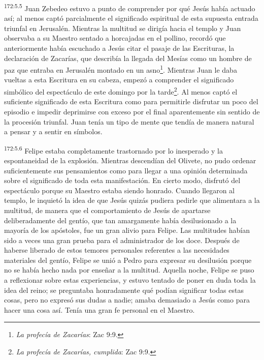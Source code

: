 \par
\textsuperscript{172:5.5} Juan Zebedeo estuvo a punto de comprender por qué Jesús había actuado así; al menos captó parcialmente el significado espiritual de esta supuesta entrada triunfal en Jerusalén. Mientras la multitud se dirigía hacia el templo y Juan observaba a su Maestro sentado a horcajadas en el pollino, recordó que anteriormente había escuchado a Jesús citar el pasaje de las Escrituras, la declaración de Zacarías, que describía la llegada del Mesías como un hombre de paz que entraba en Jerusalén montado en un asno\footnote{\textit{La profecía de Zacarías}: Zac 9:9.}. Mientras Juan le daba vueltas a esta Escritura en su cabeza, empezó a comprender el significado simbólico del espectáculo de este domingo por la tarde\footnote{\textit{La profecía de Zacarías, cumplida}: Zac 9:9.}. Al menos captó el suficiente significado de esta Escritura como para permitirle disfrutar un poco del episodio e impedir deprimirse con exceso por el final aparentemente sin sentido de la procesión triunfal. Juan tenía un tipo de mente que tendía de manera natural a pensar y a sentir en símbolos.

\par
\textsuperscript{172:5.6} Felipe estaba completamente trastornado por lo inesperado y la espontaneidad de la explosión. Mientras descendían del Olivete, no pudo ordenar suficientemente sus pensamientos como para llegar a una opinión determinada sobre el significado de toda esta manifestación. En cierto modo, disfrutó del espectáculo porque su Maestro estaba siendo honrado. Cuando llegaron al templo, le inquietó la idea de que Jesús quizás pudiera pedirle que alimentara a la multitud, de manera que el comportamiento de Jesús de apartarse deliberadamente del gentío, que tan amargamente había desilusionado a la mayoría de los apóstoles, fue un gran alivio para Felipe. Las multitudes habían sido a veces una gran prueba para el administrador de los doce. Después de haberse liberado de estos temores personales referentes a las necesidades materiales del gentío, Felipe se unió a Pedro para expresar su desilusión porque no se había hecho nada por enseñar a la multitud. Aquella noche, Felipe se puso a reflexionar sobre estas experiencias, y estuvo tentado de poner en duda toda la idea del reino; se preguntaba honradamente qué podían significar todas estas cosas, pero no expresó sus dudas a nadie; amaba demasiado a Jesús como para hacer una cosa así. Tenía una gran fe personal en el Maestro.

